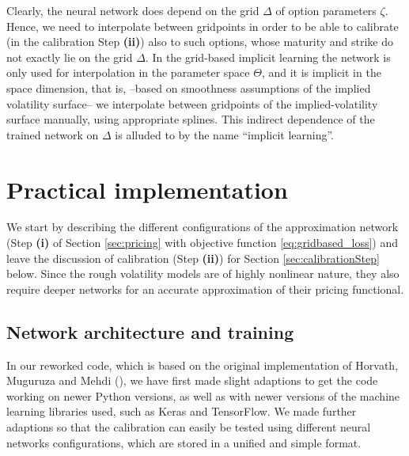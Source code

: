 \documentclass{article}
\theoremstyle{remark}
\begin{document}
Clearly, the neural network does depend on the grid $\Delta$ of option
parameters $\zeta$. Hence, we need to interpolate between gridpoints in order to be able to calibrate (in the calibration Step \textbf{(ii)}) also to such options, whose
maturity and strike do not exactly lie on the grid $\Delta$. 
In the grid-based implicit learning the network is only used for interpolation in the parameter space $\Theta$,
and it is implicit in the space dimension, that is,
--based on smoothness assumptions of the implied volatility surface--
we interpolate between gridpoints of the implied-volatility surface manually, using appropriate splines.
This indirect dependence of the trained network on $\Delta$ is alluded to by the name ``implicit learning''.

\section{Practical implementation}
\label{sec:implementation}
We start by describing the different configurations of the approximation network (Step \textbf{(i)} 
of Section \ref{sec:pricing} with objective function \eqref{eq:gridbased_loss})
and leave the discussion of calibration (Step \textbf{(ii)}) for Section \ref{sec:calibrationStep} below.
Since the rough volatility models are of highly nonlinear nature,
they also require deeper networks for an accurate approximation of their pricing functional.

\subsection{Network architecture and training}
\label{sec:architecture}
In our reworked code, which is based on the original implementation of Horvath, Muguruza and Mehdi (\cite{HMM19}),
we have first made slight adaptions to get the code working on newer Python versions,
as well as with newer versions of the machine learning libraries used, such as Keras and TensorFlow.
We made further adaptions so that the calibration can easily be tested using different neural networks configurations,
which are stored in a unified and simple format.
\end{document}
